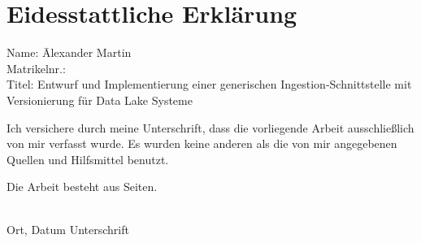 \section*{Eidesstattliche Erklärung}

\begin{tabbing}
  Name: \hspace{4em}\= Alexander Martin\\
  Matrikelnr.: \\
  Titel: \> Entwurf und Implementierung einer generischen Ingestion-Schnittstelle mit Versionierung für Data Lake Systeme
\end{tabbing}

Ich versichere durch meine Unterschrift, dass die vorliegende
Arbeit ausschließlich von mir verfasst wurde.
Es wurden keine anderen als die von mir angegebenen Quellen und Hilfsmittel
benutzt.

Die Arbeit besteht aus \underline{\hspace{3em}} Seiten.

\vspace{8ex}
\begin{tabbing}
  \underline{\hspace{14em}} \hspace{3em}\= \underline{\hspace{14em}} \\
  Ort, Datum \> Unterschrift
\end{tabbing}